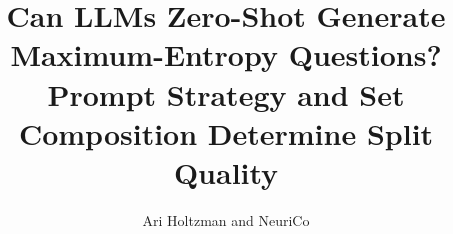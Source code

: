 \documentclass{article}
\title{Can LLMs Zero-Shot Generate Maximum-Entropy Questions? \\
Prompt Strategy and Set Composition Determine Split Quality}
\author{Ari Holtzman and NeuriCo}
\begin{document}
\maketitle

\begin{abstract}

\end{abstract}










\end{document}
